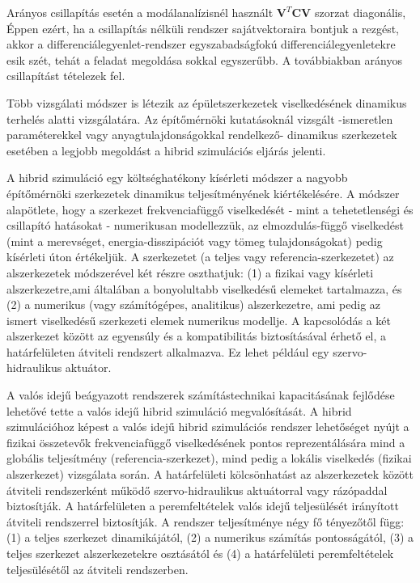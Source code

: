 Arányos csillapítás esetén a modálanalízisnél használt $\mathbf{V}^T\mathbf{C}\mathbf{V}$ szorzat diagonális, Éppen ezért, ha a csillapítás nélküli rendszer sajátvektoraira bontjuk a rezgést,
akkor a differenciálegyenlet-rendszer egyszabadságfokú differenciálegyenletekre esik szét, tehát a feladat megoldása sokkal egyszerűbb. A továbbiakban arányos csillapítást tételezek fel.%

Több vizsgálati módszer is létezik az épületszerkezetek viselkedésének dinamikus terhelés alatti vizsgálatára. Az építőmérnöki kutatásoknál vizsgált -ismeretlen paraméterekkel vagy anyagtulajdonságokkal rendelkező- dinamikus szerkezetek esetében a legjobb  megoldást a  hibrid szimulációs eljárás jelenti. 

A hibrid szimuláció \cite{hibrid wiki} egy költséghatékony kísérleti módszer a nagyobb építőmérnöki szerkezetek dinamikus teljesítményének kiértékelésére. A módszer alapötlete, hogy a szerkezet frekvenciafüggő  viselkedését - mint a tehetetlenségi és csillapító hatásokat  - numerikusan modellezzük, az elmozdulás-függő viselkedést (mint a merevséget, energia-disszipációt vagy tömeg tulajdonságokat) pedig kísérleti úton értékeljük. A szerkezetet (a teljes vagy referencia-szerkezetet) az alszerkezetek módszerével két részre oszthatjuk: (1) a fizikai vagy kísérleti alszerkezetre,ami általában a bonyolultabb viselkedésű elemeket tartalmazza, és (2) a numerikus (vagy számítógépes, analitikus) alszerkezetre, ami pedig az ismert viselkedésű szerkezeti elemek numerikus modellje.  A kapcsolódás a két alszerkezet között az egyensúly és a kompatibilitás biztosításával érhető el, a határfelületen átviteli rendszert alkalmazva. Ez lehet például egy szervo-hidraulikus aktuátor.

A valós idejű beágyazott rendszerek   számítástechnikai kapacitásának fejlődése lehetővé tette a valós idejű hibrid szimuláció megvalósítását. A hibrid szimulációhoz képest a valós idejű hibrid szimulációs rendszer lehetőséget nyújt a fizikai összetevők  frekvenciafüggő viselkedésének pontos reprezentálására  mind a globális teljesítmény (referencia-szerkezet), mind pedig a lokális viselkedés (fizikai alszerkezet) vizsgálata során. A határfelületi kölcsönhatást az alszerkezetek között átviteli rendszerként működő szervo-hidraulikus aktuátorral vagy rázópaddal biztosítják. A határfelületen a peremfeltételek valós idejű teljesülését irányított átviteli rendszerrel biztosítják. A rendszer teljesítménye négy fő tényezőtől függ: (1) a teljes szerkezet dinamikájától, (2) a numerikus számítás pontosságától, (3) a  teljes szerkezet alszerkezetekre osztásától és (4) a határfelületi peremfeltételek teljesülésétől az átviteli rendszerben.

